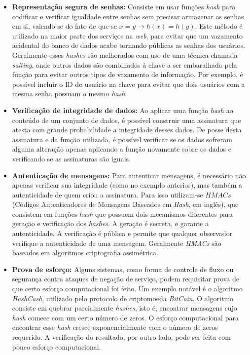 \begin{itemize}
  \item \textbf{Representação segura de senhas:} Consiste em usar funções \emph{hash} para codificar e verificar igualdade entre senhas sem precisar armazenar as senhas em si, valendo-se do fato de que se $x = y \rightarrow h(x) = h(y)$. Este método é utilizado na maior parte dos serviços na \emph{web}, para evitar que um vazamento acidental do banco de dados acabe tornando públicas as senhas dos usuários. Geralmente esses \emph{hashes} são melhorados com uso de uma técnica chamada \emph{salting}, onde outros dados são combinados à chave a ser embaralhada pela função para evitar outros tipos de vazamento de informação. Por exemplo, é possível incluir o ID do usuário na chave para evitar que dois usuários com a mesma senha possuam o mesmo \emph{hash}.

  \item \textbf{Verificação de integridade de dados:} Ao aplicar uma função \emph{hash} ao conteúdo de um conjunto de dados, é possível construir uma assinatura que atesta com grande probabilidade a integridade desses dados. De posse desta assinatura e da função utilizada, é possível verificar se os dados sofreram alguma alteração apenas aplicando a função novamente sobre os dados e verificando se as assinaturas são iguais.
  
  \item \textbf{Autenticação de mensagens:} Para autenticar mensagens, é necessário não apenas verificar sua integridade (como no exemplo anterior), mas também a autenticidade de quem criou a assinatura. Para isso utilizam-se $HMACs$ (Códigos Autenticadores de Mensagens Baseados em \emph{Hash}, em inglês), que consistem em funções \emph{hash} que possuem dois mecanismos diferentes para geração e verificação dos \emph{hashes}. A geração é secreta, e garante a autenticidade. A verificação é pública e permite que qualquer observador verifique a autenticidade de uma mensagem. Geralmente \emph{HMACs} são baseados em algoritmos criptografia assimétrica.
  
  \item \textbf{Prova de esforço:} Alguns sistemas, como forma de controle de fluxo ou segurança contra ataques de negação de serviço, podem requisitar prova de que certo esforço computacional foi feito. Um exemplo notável é o algoritmo \emph{HashCash}, utilizado pelo protocolo de criptomoeda \emph{BitCoin}. O algoritmo consiste em quebrar parcialmente \emph{hashes}, isto é, encontrar mensagens cujo \emph{hash} comece com um certo número de zeros. O esforço computacional para encontrar esse \emph{hash} cresce exponencialmente com o número de zeros requerido. A verificação do resultado, por outro lado, pode ser feita com pouco esforço computacional.
  
\end{itemize}

